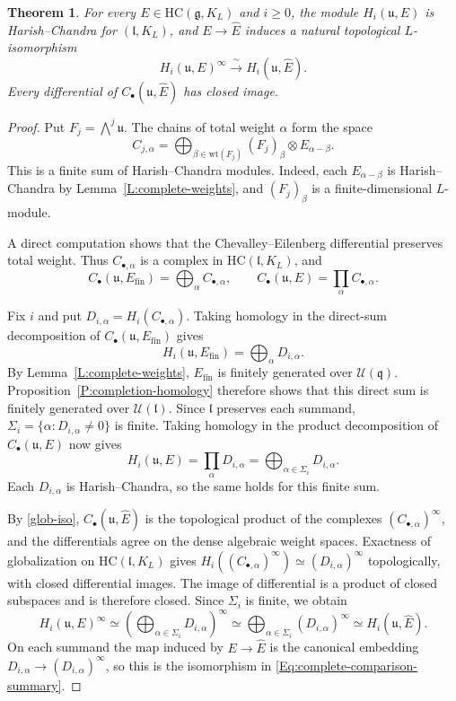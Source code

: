 \documentclass[a4paper,12pt]{amsart}
\numberwithin{equation}{section}
\theoremstyle{plain}
\newtheorem{theorem}{Theorem}[section]
\theoremstyle{definition}
\theoremstyle{remark}
\newcommand{\HC}{\mathrm{HC}}
\begin{document}
\begin{theorem}\label{T:complete-global-comparison}
For every $E\in\HC(\mathfrak g,K_L)$ and $i\geq0$, the module $H_i(\mathfrak u,E)$ is Harish--Chandra for $(\mathfrak l,K_L)$, and $E\to\widehat E$ induces a natural topological $L$-isomorphism
\begin{equation}\label{Eq:complete-comparison-summary}
 H_i(\mathfrak u,E)^\infty\xrightarrow{\ \sim\ }H_i(\mathfrak u,\widehat E).
\end{equation}
Every differential of $C_\bullet(\mathfrak u,\widehat E)$ has closed image.
\end{theorem}
\begin{proof}
Put $F_j=\bigwedge^j\mathfrak u$.
The chains of total weight $\alpha$ form the space
\[
 C_{j,\alpha}=\bigoplus_{\beta\in\mathrm{wt}(F_j)}
        (F_j)_\beta\otimes E_{\alpha-\beta}.
\]
This is a finite sum of Harish--Chandra modules.
Indeed, each $E_{\alpha-\beta}$ is Harish--Chandra by Lemma~\ref{L:complete-weights}, and $(F_j)_\beta$ is a finite-dimensional $L$-module.

A direct computation shows that the Chevalley--Eilenberg differential preserves total weight.
Thus $C_{\bullet,\alpha}$ is a complex in $\HC(\mathfrak l,K_L)$, and
\[
 C_\bullet(\mathfrak u,E_{\mathrm{fin}})=\bigoplus_\alpha C_{\bullet,\alpha},
 \qquad C_\bullet(\mathfrak u,E)=\prod_\alpha C_{\bullet,\alpha}.
\]

Fix $i$ and put $D_{i,\alpha}=H_i(C_{\bullet,\alpha})$.
Taking homology in the direct-sum decomposition of $C_\bullet(\mathfrak u,E_{\mathrm{fin}})$ gives
\[
 H_i(\mathfrak u,E_{\mathrm{fin}})=\bigoplus_\alpha D_{i,\alpha}.
\]
By Lemma~\ref{L:complete-weights}, $E_{\mathrm{fin}}$ is finitely generated over $\mathcal U(\mathfrak q)$.
Proposition~\ref{P:completion-homology} therefore shows that this direct sum is finitely generated over $\mathcal U(\mathfrak l)$.
Since $\mathfrak l$ preserves each summand, $\Sigma_i=\{\alpha:D_{i,\alpha}\ne0\}$ is finite.
Taking homology in the product decomposition of $C_\bullet(\mathfrak u,E)$ now gives
\[
 H_i(\mathfrak u,E)=\prod_\alpha D_{i,\alpha}
                   =\bigoplus_{\alpha\in\Sigma_i}D_{i,\alpha}.
\]
Each $D_{i,\alpha}$ is Harish--Chandra, so the same holds for this finite sum.

By \eqref{glob-iso}, $C_\bullet(\mathfrak u,\widehat E)$ is the topological product of the complexes $(C_{\bullet,\alpha})^\infty$, and the differentials agree on the dense algebraic weight spaces.
Exactness of globalization on $\HC(\mathfrak l,K_L)$ gives $H_i((C_{\bullet,\alpha})^\infty)\simeq(D_{i,\alpha})^\infty$ topologically, with closed differential images.
The image of differential is a product of closed subspaces and is therefore closed.
Since $\Sigma_i$ is finite, we obtain
\[
 H_i(\mathfrak u,E)^\infty
 \simeq\left(\bigoplus_{\alpha\in\Sigma_i}D_{i,\alpha}\right)^\infty
 \simeq\bigoplus_{\alpha\in\Sigma_i}(D_{i,\alpha})^\infty
 \simeq H_i(\mathfrak u,\widehat E).
\]
On each summand the map induced by $E\to\widehat E$ is the canonical embedding $D_{i,\alpha}\to(D_{i,\alpha})^\infty$, so this is the isomorphism in \eqref{Eq:complete-comparison-summary}.
\end{proof}
\end{document}
